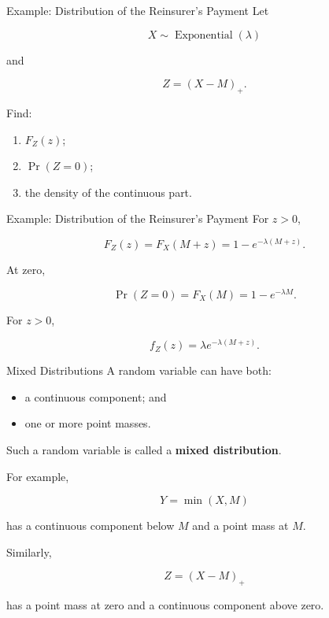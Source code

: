 \documentclass[
  ignorenonframetext,
  aspectratio=169,
]{beamer}
\providecommand{\tightlist}{%
  \setlength{\itemsep}{0pt}\setlength{\parskip}{0pt}}
\begin{document}
\begin{frame}{Example: Distribution of the Reinsurer's Payment}
\protect{}\label{example-distribution-of-the-reinsurers-payment}
Let

\[
X\sim\operatorname{Exponential}(\lambda)
\]

and

\[
Z=(X-M)_+.
\]

Find:

\begin{enumerate}
\tightlist
\item
  \(F_Z(z)\);
\item
  \(\Pr(Z=0)\);
\item
  the density of the continuous part.
\end{enumerate}
\end{frame}

\begin{frame}{Example: Distribution of the Reinsurer's Payment}
\protect{}\label{example-distribution-of-the-reinsurers-payment-1}
For \(z>0\),

\[
F_Z(z)
=
F_X(M+z)
=
1-e^{-\lambda(M+z)}.
\]

At zero,

\[
\boxed{
\Pr(Z=0)
=
F_X(M)
=
1-e^{-\lambda M}.
}
\]

For \(z>0\),

\[
\boxed{
f_Z(z)
=
\lambda e^{-\lambda(M+z)}.
}
\]
\end{frame}

\begin{frame}{Mixed Distributions}
\protect{}\label{mixed-distributions-1}
A random variable can have both:

\begin{itemize}
\tightlist
\item
  a continuous component; and
\item
  one or more point masses.
\end{itemize}

Such a random variable is called a \textbf{mixed distribution}.

For example,

\[
Y=\min(X,M)
\]

has a continuous component below \(M\) and a point mass at \(M\).

Similarly,

\[
Z=(X-M)_+
\]

has a point mass at zero and a continuous component above zero.
\end{frame}
\end{document}
